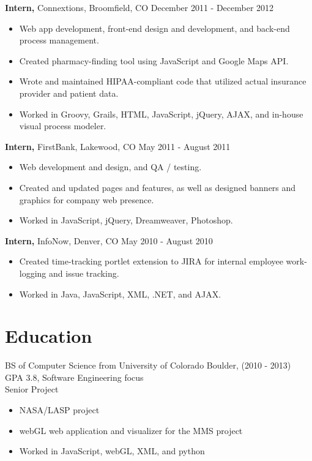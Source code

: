 \documentclass[margin]{res}
\begin{document}
\begin{resume}
 {\bf Intern,} Connextions, Broomfield, CO  \hfill December 2011 - December 2012
 \begin{itemize} \itemsep -2pt  %
 \item Web app development, front-end design and development, and back-end process management.
 \item Created pharmacy-finding tool using JavaScript and Google Maps API. 
 \item Wrote and maintained HIPAA-compliant code that utilized actual insurance provider and patient data.
 \item Worked in Groovy, Grails, HTML, JavaScript, jQuery, AJAX, and in-house visual process modeler.
 \end{itemize}

 {\bf Intern,} FirstBank, Lakewood, CO  \hfill May 2011 - August 2011
 \begin{itemize} \itemsep -2pt  %
 \item Web development and design, and QA / testing.
 \item Created and updated pages and features, as well as designed banners and graphics for company web presence.
 \item Worked in JavaScript, jQuery, Dreamweaver, Photoshop.
 \end{itemize}

 {\bf Intern,} InfoNow, Denver, CO  \hfill May 2010 - August 2010
 \begin{itemize} \itemsep -2pt  %
 \item Created time-tracking portlet extension to JIRA for internal employee work-logging and issue tracking.
 \item Worked in Java, JavaScript, XML, .NET, and AJAX. 
 \end{itemize}

\section{Education} 
  BS of Computer Science from University of Colorado Boulder, (2010 - 2013)\\
  GPA 3.8, Software Engineering focus \\
  Senior Project
  \begin{itemize} \itemsep -2pt  %
  \item NASA/LASP project
  \item webGL web application and visualizer for the MMS project
  \item Worked in JavaScript, webGL, XML, and python
  \end{itemize}  


\end{resume}
\end{document}
